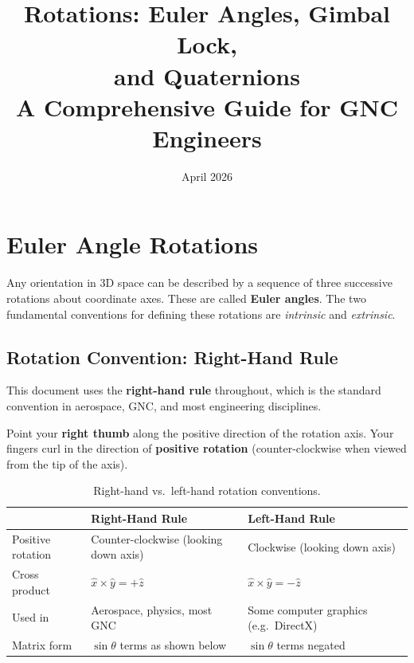 \documentclass[12pt,a4paper]{article}
\title{\textbf{Rotations: Euler Angles, Gimbal Lock,\\[0.3em]
       and Quaternions}\\[0.5em]
       \large A Comprehensive Guide for GNC Engineers}
\author{}
\date{April 2026}
\begin{document}
\maketitle
\tableofcontents
\newpage

\section{Euler Angle Rotations}

Any orientation in 3D space can be described by a sequence of three successive
rotations about coordinate axes. These are called \textbf{Euler angles}. The
two fundamental conventions for defining these rotations are
\emph{intrinsic} and \emph{extrinsic}.

\subsection{Rotation Convention: Right-Hand Rule}

This document uses the \textbf{right-hand rule} throughout, which is the
standard convention in aerospace, GNC, and most engineering disciplines.

\begin{keybox}
Point your \textbf{right thumb} along the positive direction of the rotation
axis. Your fingers curl in the direction of \textbf{positive rotation}
(counter-clockwise when viewed from the tip of the axis).
\end{keybox}

\begin{table}[h]
\centering
\begin{tabular}{@{}lll@{}}
\toprule
 & \textbf{Right-Hand Rule} & \textbf{Left-Hand Rule} \\
\midrule
Positive rotation & Counter-clockwise (looking down axis) &
  Clockwise (looking down axis) \\
Cross product     & $\hat{x}\times\hat{y}=+\hat{z}$ &
  $\hat{x}\times\hat{y}=-\hat{z}$ \\
Used in           & Aerospace, physics, most GNC &
  Some computer graphics (e.g.\ DirectX) \\
Matrix form       & $\sin\theta$ terms as shown below &
  $\sin\theta$ terms negated \\
\bottomrule
\end{tabular}
\caption{Right-hand vs.\ left-hand rotation conventions.}
\end{table}
\end{document}
